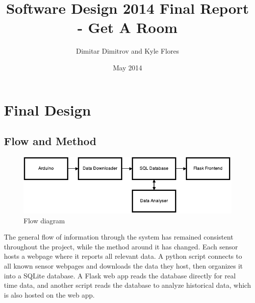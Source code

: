 \documentclass{article}
\title{Software Design 2014 Final Report - Get A Room}
\author{Dimitar Dimitrov and Kyle Flores}
\date{May 2014}
\begin{document}
\maketitle

\section*{Final Design}
\subsection*{Flow and Method}
\FloatBarrier
\begin{figure}[h!]
    \centering
    \includegraphics[scale=0.75]{flowpicture.pdf}
    \caption{Flow diagram}
\end{figure}
\FloatBarrier
\par The general flow of information through the system has remained consistent throughout the project, while the method around it has changed. Each sensor hosts a webpage where it reports all relevant data. A python script connects to all known sensor webpages and downloads the data they host, then organizes it into a SQLite database. A Flask web app reads the database directly for real time data, and another script reads the database to analyze historical data, which is also hosted on the web app.
\end{document}

